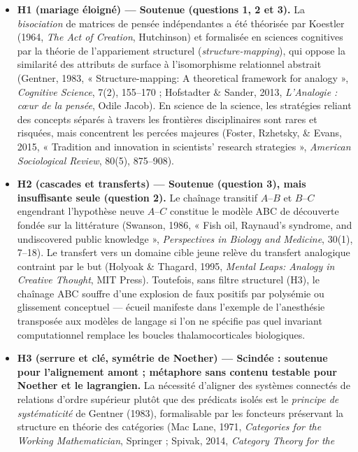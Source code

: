 \documentclass[a4paper,11pt]{article}
\providecommand{\tightlist}{\setlength{\itemsep}{0pt}\setlength{\parskip}{0pt}}
\begin{document}
\begin{itemize}
\tightlist
\item
  \textbf{H1 (mariage éloigné) --- Soutenue (questions 1, 2 et 3).} La
  \emph{bisociation} de matrices de pensée indépendantes a été théorisée
  par Koestler (1964, \emph{The Act of Creation}, Hutchinson) et
  formalisée en sciences cognitives par la théorie de l'appariement
  structurel (\emph{structure-mapping}), qui oppose la similarité des
  attributs de surface à l'isomorphisme relationnel abstrait (Gentner,
  1983, « Structure-mapping: A theoretical framework for analogy »,
  \emph{Cognitive Science}, 7(2), 155--170 ; Hofstadter \& Sander, 2013,
  \emph{L'Analogie : cœur de la pensée}, Odile Jacob). En science de la
  science, les stratégies reliant des concepts séparés à travers les
  frontières disciplinaires sont rares et risquées, mais concentrent les
  percées majeures (Foster, Rzhetsky, \& Evans, 2015, « Tradition and
  innovation in scientists' research strategies », \emph{American
  Sociological Review}, 80(5), 875--908).
\item
  \textbf{H2 (cascades et transferts) --- Soutenue (question 3), mais
  insuffisante seule (question 2).} Le chaînage transitif
  \(A\text{--}B\) et \(B\text{--}C\) engendrant l'hypothèse neuve
  \(A\text{--}C\) constitue le modèle ABC de découverte fondée sur la
  littérature (Swanson, 1986, « Fish oil, Raynaud's syndrome, and
  undiscovered public knowledge », \emph{Perspectives in Biology and
  Medicine}, 30(1), 7--18). Le transfert vers un domaine cible jeune
  relève du transfert analogique contraint par le but (Holyoak \&
  Thagard, 1995, \emph{Mental Leaps: Analogy in Creative Thought}, MIT
  Press). Toutefois, sans filtre structurel (H3), le chaînage ABC
  souffre d'une explosion de faux positifs par polysémie ou glissement
  conceptuel --- écueil manifeste dans l'exemple de l'anesthésie
  transposée aux modèles de langage si l'on ne spécifie pas quel
  invariant computationnel remplace les boucles thalamocorticales
  biologiques.
\item
  \textbf{H3 (serrure et clé, symétrie de Noether) --- Scindée :
  soutenue pour l'alignement amont ; métaphore sans contenu testable
  pour Noether et le lagrangien.} La nécessité d'aligner des systèmes
  connectés de relations d'ordre supérieur plutôt que des prédicats
  isolés est le \emph{principe de systématicité} de Gentner (1983),
  formalisable par les foncteurs préservant la structure en théorie des
  catégories (Mac Lane, 1971, \emph{Categories for the Working
  Mathematician}, Springer ; Spivak, 2014, \emph{Category Theory for the
}
\end{itemize}
\end{document}
